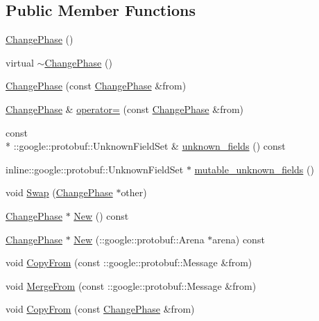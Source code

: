 \subsection*{Public Member Functions}
\begin{DoxyCompactItemize}
\item 
\hyperlink{class_change_phase_a55399456105069f2863aebe7aea547c4}{Change\-Phase} ()
\item 
virtual \hyperlink{class_change_phase_a26d93c2888e190e261d2fad2e747d2cd}{$\sim$\-Change\-Phase} ()
\item 
\hyperlink{class_change_phase_a4b9f1307f5e414f9e31028593df82821}{Change\-Phase} (const \hyperlink{class_change_phase}{Change\-Phase} \&from)
\item 
\hyperlink{class_change_phase}{Change\-Phase} \& \hyperlink{class_change_phase_afe1b8fb71c597241a130e5a0361084ff}{operator=} (const \hyperlink{class_change_phase}{Change\-Phase} \&from)
\item 
const \\*
\-::google\-::protobuf\-::\-Unknown\-Field\-Set \& \hyperlink{class_change_phase_a35fed0c7a4fe24a8aa7fdeedde702f25}{unknown\-\_\-fields} () const 
\item 
inline\-::google\-::protobuf\-::\-Unknown\-Field\-Set $\ast$ \hyperlink{class_change_phase_ae7bdf30321b4858a0947396ed19a8d9c}{mutable\-\_\-unknown\-\_\-fields} ()
\item 
void \hyperlink{class_change_phase_a4be33194d239e28dd0aecaf4d836a809}{Swap} (\hyperlink{class_change_phase}{Change\-Phase} $\ast$other)
\item 
\hyperlink{class_change_phase}{Change\-Phase} $\ast$ \hyperlink{class_change_phase_a9c62cc118ada96ab07093b542f54f651}{New} () const 
\item 
\hyperlink{class_change_phase}{Change\-Phase} $\ast$ \hyperlink{class_change_phase_af8041c1ea9d514c054ff97dea9691413}{New} (\-::google\-::protobuf\-::\-Arena $\ast$arena) const 
\item 
void \hyperlink{class_change_phase_aaa00056e07d103185fb7d3c9b2c80c89}{Copy\-From} (const \-::google\-::protobuf\-::\-Message \&from)
\item 
void \hyperlink{class_change_phase_a0b4ea2d69bef41bfd5def289ed42f48b}{Merge\-From} (const \-::google\-::protobuf\-::\-Message \&from)
\item 
void \hyperlink{class_change_phase_acc54fcc2735378a34fe9f313b0d28d90}{Copy\-From} (const \hyperlink{class_change_phase}{Change\-Phase} \&from)
\item 

\end{DoxyCompactItemize}
